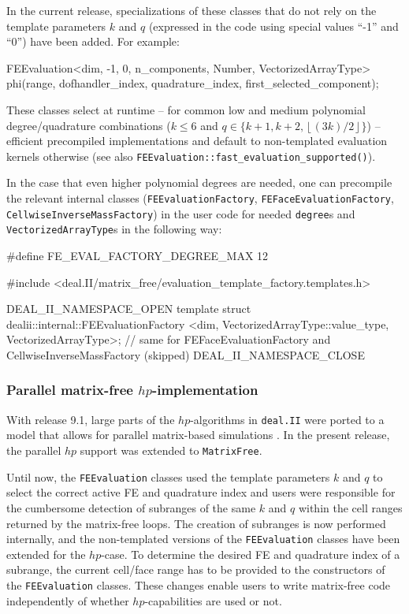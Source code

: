 \documentclass{ansarticle-preprint}
\newcommand{\specialword}[1]{\texttt{#1}}
\newcommand{\dealii}{{\specialword{deal.II}}\xspace}
\begin{document}
In the current release, specializations of these classes that do
not rely on the template parameters $k$ and $q$ (expressed in the code
using special values ``-1'' and ``0'') have been added. For example:
\begin{c++}
FEEvaluation<dim, -1, 0, n_components, Number, VectorizedArrayType>
  phi(range, dofhandler_index, quadrature_index, first_selected_component);
\end{c++}
These classes select at runtime -- for common low and medium
polynomial degree/quadrature combinations ($k\le 6$ and $q\in\{ k+1,
k+2, \left\lfloor (3k)/2 \right\rfloor \}$) -- efficient precompiled implementations and default to non-templated
evaluation kernels otherwise (see also \texttt{FEEvaluation::fast\_evaluation\_\allowbreak supported()}).

In the case that even higher polynomial degrees are needed, one can precompile the
relevant internal classes
(\texttt{FEEvaluationFactory}, \texttt{FEFaceEvaluationFactory}, \texttt{CellwiseInverseMassFactory}) in the user code for needed \texttt{degree}s
and \texttt{VectorizedArrayType}s in the following way:
\begin{c++}
#define FE_EVAL_FACTORY_DEGREE_MAX 12

#include <deal.II/matrix_free/evaluation_template_factory.templates.h>

DEAL_II_NAMESPACE_OPEN
template struct dealii::internal::FEEvaluationFactory
  <dim, VectorizedArrayType::value_type, VectorizedArrayType>;
// same for FEFaceEvaluationFactory and CellwiseInverseMassFactory (skipped)
DEAL_II_NAMESPACE_CLOSE
\end{c++}


\subsubsection{Parallel matrix-free $hp$-implementation}\label{subsubsection:mf:hp}

With release 9.1, large parts of the $hp$-algorithms
in \dealii were ported to a model that allows for
parallel matrix-based simulations \cite{dealII91}. In the present
release, the parallel $hp$ support was extended to \texttt{MatrixFree}.

Until now, the \texttt{FEEvaluation} classes used the template
parameters $k$ and $q$ to select the correct active FE and quadrature
index and users were responsible for the cumbersome detection of 
subranges of the same $k$ and $q$ within the cell ranges returned by the 
matrix-free loops.
The creation of subranges is now performed internally, and the non-templated versions
of the \texttt{FEEvaluation} classes have been extended for the $hp$-case. To determine
the desired FE and quadrature index of a subrange, the current cell/face range has to be provided
to the constructors of the \texttt{FEEvaluation} classes. These changes enable
users to write matrix-free code independently of whether $hp$-capabilities are used or not.
\end{document}
